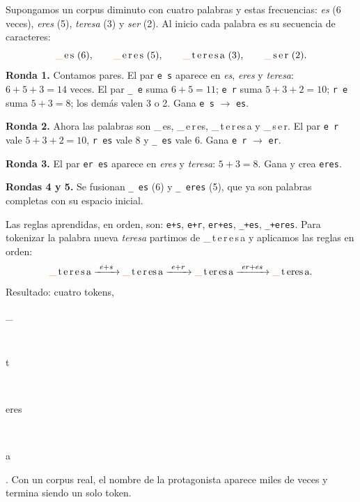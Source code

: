 \documentclass[11pt,letterpaper,oneside]{report}
\newcommand{\esp}{\textcolor{anahuac}{\_}}
\newcommand{\tok}[1]{\colorbox{naranjabg}{\strut\ttfamily\small #1}}
\begin{document}
\begin{ejemplo}
Supongamos un corpus diminuto con cuatro palabras y estas frecuencias: \emph{es} (6 veces), \emph{eres} (5), \emph{teresa} (3) y \emph{ser} (2). Al inicio cada palabra es su secuencia de caracteres:
\[
\text{\esp\,e\,s}\ (6),\qquad \text{\esp\,e\,r\,e\,s}\ (5),\qquad \text{\esp\,t\,e\,r\,e\,s\,a}\ (3),\qquad \text{\esp\,s\,e\,r}\ (2).
\]
\textbf{Ronda 1.} Contamos pares. El par \texttt{e s} aparece en \emph{es}, \emph{eres} y \emph{teresa}: $6+5+3 = 14$ veces. El par \texttt{\esp{} e} suma $6+5 = 11$; \texttt{e r} suma $5+3+2 = 10$; \texttt{r e} suma $5+3 = 8$; los demás valen 3 o 2. Gana \texttt{e s} $\to$ \texttt{es}.

\textbf{Ronda 2.} Ahora las palabras son \esp\,es, \esp\,e\,r\,es, \esp\,t\,e\,r\,es\,a y \esp\,s\,e\,r. El par \texttt{e r} vale $5+3+2 = 10$, \texttt{r es} vale 8 y \texttt{\esp{} es} vale 6. Gana \texttt{e r} $\to$ \texttt{er}.

\textbf{Ronda 3.} El par \texttt{er es} aparece en \emph{eres} y \emph{teresa}: $5+3 = 8$. Gana y crea \texttt{eres}.

\textbf{Rondas 4 y 5.} Se fusionan \texttt{\esp{} es} (6) y \texttt{\esp{} eres} (5), que ya son palabras completas con su espacio inicial.

Las reglas aprendidas, en orden, son: \texttt{e+s}, \texttt{e+r}, \texttt{er+es}, \texttt{\esp+es}, \texttt{\esp+eres}. Para tokenizar la palabra nueva \emph{teresa} partimos de \esp\,t\,e\,r\,e\,s\,a y aplicamos las reglas en orden:
\[
\text{\esp\,t\,e\,r\,e\,s\,a} \xrightarrow{\ e+s\ } \text{\esp\,t\,e\,r\,es\,a} \xrightarrow{\ e+r\ } \text{\esp\,t\,er\,es\,a} \xrightarrow{\ er+es\ } \text{\esp\,t\,eres\,a}.
\]
Resultado: cuatro tokens, \tok{\esp}\,\tok{t}\,\tok{eres}\,\tok{a}. Con un corpus real, el nombre de la protagonista aparece miles de veces y termina siendo un solo token.
\end{ejemplo}
\end{document}

